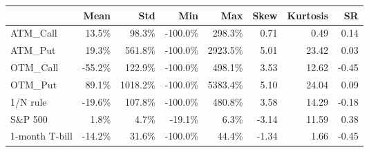 \begin{tabular}{lrrrrrrr}
\hline
                &   Mean &     Std &     Min &     Max &   Skew &   Kurtosis &    SR \\
\hline
 ATM\_Call       &  13.5\% &   98.3\% & -100.0\% &  298.3\% &   0.71 &       0.49 &  0.14 \\
 ATM\_Put        &  19.3\% &  561.8\% & -100.0\% & 2923.5\% &   5.01 &      23.42 &  0.03 \\
 OTM\_Call       & -55.2\% &  122.9\% & -100.0\% &  498.1\% &   3.53 &      12.62 & -0.45 \\
 OTM\_Put        &  89.1\% & 1018.2\% & -100.0\% & 5383.4\% &   5.10 &      24.04 &  0.09 \\
 1/N rule       & -19.6\% &  107.8\% & -100.0\% &  480.8\% &   3.58 &      14.29 & -0.18 \\
 S\&P 500        &   1.8\% &    4.7\% &  -19.1\% &    6.3\% &  -3.14 &      11.59 &  0.38 \\
 1-month T-bill & -14.2\% &   31.6\% & -100.0\% &   44.4\% &  -1.34 &       1.66 & -0.45 \\
\hline
\end{tabular}
